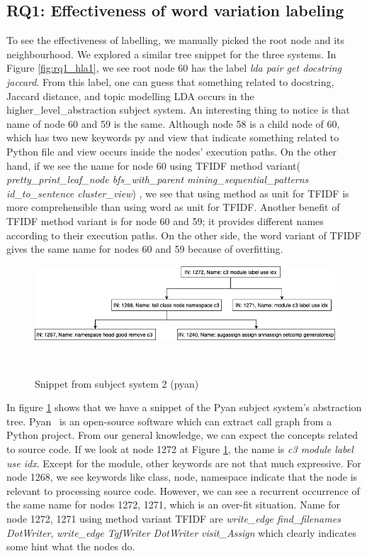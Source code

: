 \subsection{ RQ1: Effectiveness of word variation labeling}
To see the effectiveness of labelling, we manually picked the root node and its neighbourhood. We explored a similar tree snippet for the three systems. In Figure \ref{fig:rq1_hla1}, we see root node 60 has the label \textit{lda pair get docstring jaccard}. From this label, one can guess that something related to docstring, Jaccard distance, and topic modelling LDA occurs in the higher\_level\_abstraction subject system. An interesting thing to notice is that name of node 60 and 59 is the same. Although node 58 is a child node of 60, which has two new keywords py and view that indicate something related to Python file and view occurs inside the nodes' execution paths. On the other hand, if we see the name for node 60 using TFIDF method variant( \textit{pretty\_print\_leaf\_node bfs\_with\_parent mining\_sequential\_patterns id\_to\_sentence cluster\_view}) , we see that using method as unit for TFIDF is more comprehensible than using word as unit for TFIDF. Another benefit of TFIDF method variant is for node 60 and 59; it provides different names according to their execution paths. On the other side, the word variant of TFIDF gives the same name for nodes 60 and 59 because of over\-fitting.

\begin{figure}[tb]
  \centering
  \includegraphics[width=\columnwidth]{figures/hla2/rq1_pyan1.png}
  \caption{Snippet from subject system 2 (pyan)}~\label{fig:rq1_pyan1}
\end{figure}

In figure \ref{fig:rq1_pyan1} shows that we have a snippet of the Pyan subject system's abstraction tree. Pyan~\cite{pyan} is an open-source software which can extract call graph from a Python project. From our general knowledge, we can expect the concepts related to source code. If we look at node 1272 at Figure \ref{fig:rq1_pyan1}, the name is \textit{c3 module label use idx}. Except for the module, other keywords are not that much expressive. For node 1268, we see keywords like class, node, namespace indicate that the node is relevant to processing source code. However, we can see a recurrent occurrence of the same name for nodes 1272, 1271, which is an over-fit situation. Name for node 1272, 1271 using method variant TFIDF are 
\textit{write\_edge  find\_filenames  DotWriter}, \textit{write\_edge TgfWriter DotWriter visit\_Assign}  which clearly indicates some hint what the nodes do. 

